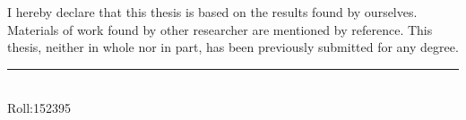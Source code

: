 I hereby declare that this thesis is based on the results found by ourselves. Materials
of work found by other researcher are mentioned by reference. This thesis, neither in
whole nor in part, has been previously submitted for any degree.

\vspace{1in}


\noindent   \rule{3.5cm}{1pt} \\
   Roll:152395 \\

